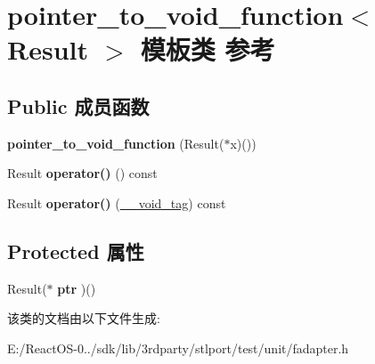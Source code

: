 \hypertarget{classpointer__to__void__function}{}\section{pointer\+\_\+to\+\_\+void\+\_\+function$<$ Result $>$ 模板类 参考}
\label{classpointer__to__void__function}
\subsection*{Public 成员函数}
\begin{DoxyCompactItemize}
\item 
\mbox{\label{classpointer__to__void__function_a8f3509cf6f8c14f59c75f27f00eadbe3}} 
{\bfseries pointer\+\_\+to\+\_\+void\+\_\+function} (Result($\ast$x)())
\item 
\mbox{\label{classpointer__to__void__function_acfdf92a8c701dcbee00d07ac7cd6f7c6}} 
Result {\bfseries operator()} () const
\item 
\mbox{\label{classpointer__to__void__function_af57a53d2d01a58e936be417aebff73d4}} 
Result {\bfseries operator()} (\hyperlink{struct____void__tag}{\+\_\+\+\_\+void\+\_\+tag}) const
\end{DoxyCompactItemize}
\subsection*{Protected 属性}
\begin{DoxyCompactItemize}
\item 
\mbox{\label{classpointer__to__void__function_adaa883c939644108ef17face56392304}} 
Result($\ast$ {\bfseries ptr} )()
\end{DoxyCompactItemize}


该类的文档由以下文件生成\+:\begin{DoxyCompactItemize}
\item 
E\+:/\+React\+O\+S-\/0../sdk/lib/3rdparty/stlport/test/unit/fadapter.\+h\end{DoxyCompactItemize}
